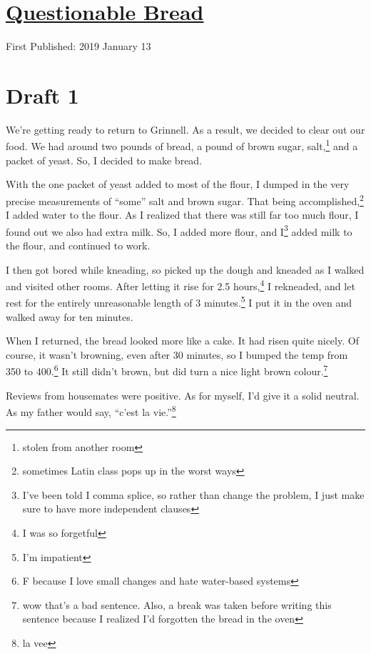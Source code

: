 \documentclass[12pt]{article}[titlepage]
\newcommand{\say}[1]{``#1''}
\newcommand{\1}{\={a}}
\newcommand{\2}{\={e}}
\newcommand{\3}{\={\i}}
\newcommand{\4}{\=o}
\newcommand{\5}{\=u}
\newcommand{\6}{\={A}}
\renewcommand{\,}{\textsuperscript{,}}
\begin{document}
\doublespacing
\section{\href{questionable-bread.html}{Questionable Bread}}
First Published: 2019 January 13
\section{Draft 1}
We're getting ready to return to Grinnell.
As a result, we decided to clear out our food.
We had around two pounds of bread, a pound of brown sugar, salt,\footnote{stolen from another room} and a packet of yeast.
So, I decided to make bread.

With the one packet of yeast added to most of the flour, I dumped in the very precise measurements of \say{some} salt and brown sugar.
That being accomplished,\footnote{sometimes Latin class pops up in the worst ways} I added water to the flour.
As I realized that there was still far too much flour, I found out we also had extra milk.
So, I added more flour, and I\footnote{I've been told I comma splice, so rather than change the problem, I just make sure to have more independent clauses} added milk to the flour, and continued to work.

I then got bored while kneading, so picked up the dough and kneaded as I walked and visited other rooms.
After letting it rise for 2.5 hours,\footnote{I was so forgetful} I rekneaded, and let rest for the entirely unreasonable length of 3 minutes.\footnote{I'm impatient}
I put it in the oven and walked away for ten minutes.

When I returned, the bread looked more like a cake.
It had risen quite nicely.
Of course, it wasn't browning, even after 30 minutes, so I bumped the temp from 350 to 400.\footnote{F because I love small changes and hate water-based systems}
It still didn't brown, but did turn a nice light brown colour.\footnote{wow that's a bad sentence. Also, a break was taken before writing this sentence because I realized I'd forgotten the bread in the oven}

Reviews from housemates were positive.
As for myself, I'd give it a solid neutral.
As my father would say, \say{c'est la vie.}\footnote{la vee}
\end{document}
